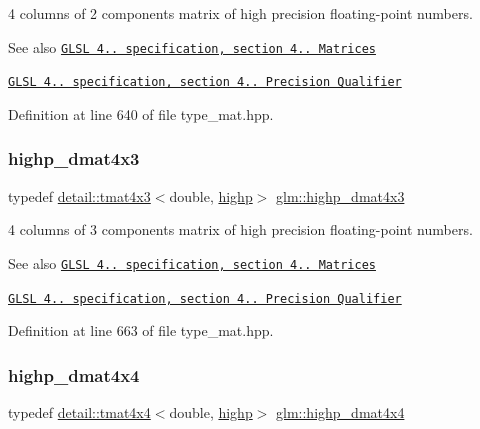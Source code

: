 4 columns of 2 components matrix of high precision floating-\/point numbers.

\begin{DoxySeeAlso}{See also}
\href{http://www.opengl.org/registry/doc/GLSLangSpec.4.20.8.pdf}{\tt G\+L\+SL 4.. specification, section 4.. Matrices} 

\href{http://www.opengl.org/registry/doc/GLSLangSpec.4.20.8.pdf}{\tt G\+L\+SL 4.. specification, section 4.. Precision Qualifier} 
\end{DoxySeeAlso}


Definition at line 640 of file type\+\_\+mat.\+hpp.

\mbox{\label{group__core__precision_gaf8aeba0eecc5c651e0f06414b6e37754}} 
\subsubsection{\texorpdfstring{highp\+\_\+dmat4x3}{highp\_dmat4x3}}
{\footnotesize\ttfamily typedef \hyperlink{structglm_1_1detail_1_1tmat4x3}{detail\+::tmat4x3}$<$double, \hyperlink{namespaceglm_a0f04f086094c747d227af4425893f545ac6f7eab42eacbb10d59a58e95e362074}{highp}$>$ \hyperlink{group__core__precision_gaf8aeba0eecc5c651e0f06414b6e37754}{glm\+::highp\+\_\+dmat4x3}}

4 columns of 3 components matrix of high precision floating-\/point numbers.

\begin{DoxySeeAlso}{See also}
\href{http://www.opengl.org/registry/doc/GLSLangSpec.4.20.8.pdf}{\tt G\+L\+SL 4.. specification, section 4.. Matrices} 

\href{http://www.opengl.org/registry/doc/GLSLangSpec.4.20.8.pdf}{\tt G\+L\+SL 4.. specification, section 4.. Precision Qualifier} 
\end{DoxySeeAlso}


Definition at line 663 of file type\+\_\+mat.\+hpp.

\mbox{\label{group__core__precision_ga1c0a2edbde597b59e9005691a224b208}} 
\subsubsection{\texorpdfstring{highp\+\_\+dmat4x4}{highp\_dmat4x4}}
{\footnotesize\ttfamily typedef \hyperlink{structglm_1_1detail_1_1tmat4x4}{detail\+::tmat4x4}$<$double, \hyperlink{namespaceglm_a0f04f086094c747d227af4425893f545ac6f7eab42eacbb10d59a58e95e362074}{highp}$>$ \hyperlink{group__core__precision_ga1c0a2edbde597b59e9005691a224b208}{glm\+::highp\+\_\+dmat4x4}}


